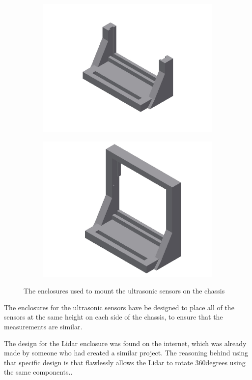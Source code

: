 \begin{figure}[H]
	\centering
	\begin{subfigure}[H]{0.4\textwidth}
		\includegraphics[width=\textwidth]{images/ultrasonicholder.jpg}
	\end{subfigure}%
	\quad
	\begin{subfigure}[H]{0.4\textwidth}
		\includegraphics[width=\textwidth]{images/ultrasonicholder-upsidedown.jpg}
	\end{subfigure}
	\caption{The enclosures used to mount the ultrasonic sensors on the chassis}
\end{figure}

The enclosures for the ultrasonic sensors have be designed to place all of the sensors at the same height on each side of the chassis, to ensure that the measurements are similar.


The design for the Lidar enclosure was found on the internet, which was already made by someone who had created a similar project. The reasoning behind using that specific design is that flawlessly allows the Lidar to rotate 360degrees using the same components.\cite{lidarenclosure}.

